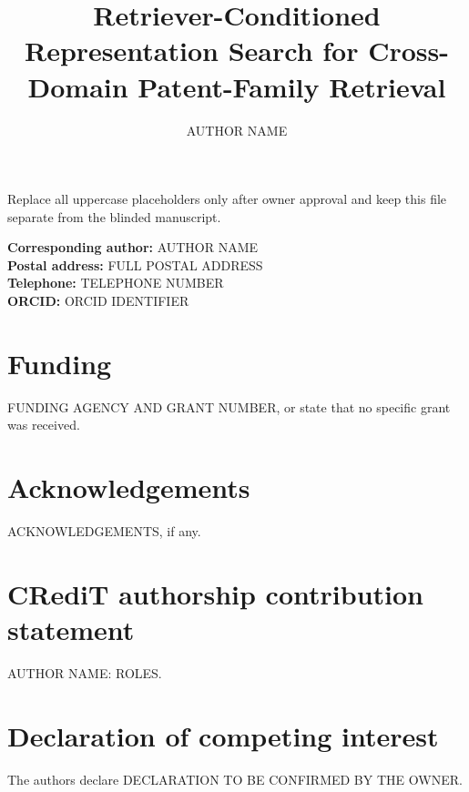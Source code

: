 \documentclass[preprint,12pt]{elsarticle}
\begin{document}
\begin{frontmatter}

\title{Retriever-Conditioned Representation Search for Cross-Domain Patent-Family Retrieval}

\author[aff1]{AUTHOR NAME}
\address[aff1]{DEPARTMENT, INSTITUTION, CITY, COUNTRY}

\end{frontmatter}

\noindent Replace all uppercase placeholders only after owner approval and
keep this file separate from the blinded manuscript.

\noindent\textbf{Corresponding author:} AUTHOR NAME\\
\textbf{Postal address:} FULL POSTAL ADDRESS\\
\textbf{Telephone:} TELEPHONE NUMBER\\
\textbf{ORCID:} ORCID IDENTIFIER

\section*{Funding}
FUNDING AGENCY AND GRANT NUMBER, or state that no specific grant was received.

\section*{Acknowledgements}
ACKNOWLEDGEMENTS, if any.

\section*{CRediT authorship contribution statement}
AUTHOR NAME: ROLES.

\section*{Declaration of competing interest}
The authors declare DECLARATION TO BE CONFIRMED BY THE OWNER.
\end{document}
